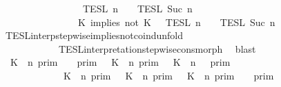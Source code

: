 \begin{isabellebody}
\ \ \ \ \ \ \ \ \ \ \ \ \ \ {\isasyminter}\ {\isacharparenleft}{\isasymlbrakk}{\isasymlbrakk}\ {\isasymPsi}\ {\isasymrbrakk}{\isasymrbrakk}\isactrlsub T\isactrlsub E\isactrlsub S\isactrlsub L\isactrlbsup {\isasymge}\ n\isactrlesup \ {\isasyminter}\ {\isasymlbrakk}{\isasymlbrakk}\ {\isasymPhi}\ {\isasymrbrakk}{\isasymrbrakk}\isactrlsub T\isactrlsub E\isactrlsub S\isactrlsub L\isactrlbsup {\isasymge}\ Suc\ n\isactrlesup {\isacharparenright}\isanewline
\ \ \ \ \ \ \ \ \ \ \ \ \ \ {\isacharequal}\ {\isasymlbrakk}{\isasymlbrakk}\ {\isacharparenleft}K\ implies\ not\ K\ {\isacharhash}\ {\isasymPsi}\ {\isasymrbrakk}{\isasymrbrakk}\isactrlsub T\isactrlsub E\isactrlsub S\isactrlsub L\isactrlbsup {\isasymge}\ n\isactrlesup \ {\isasyminter}\ {\isasymlbrakk}{\isasymlbrakk}\ {\isasymPhi}\ {\isasymrbrakk}{\isasymrbrakk}\isactrlsub T\isactrlsub E\isactrlsub S\isactrlsub L\isactrlbsup {\isasymge}\ Suc\ n\isactrlesup {\isacartoucheclose}\isanewline
\ \ \ \ \ \ \isamarkupfalse%
\ TESL{\isacharunderscore}interp{\isacharunderscore}stepwise{\isacharunderscore}implies{\isacharunderscore}not{\isacharunderscore}coind{\isacharunderscore}unfold\isanewline
\ \ \ \ \ \ \ \ \ \ \ \ TESL{\isacharunderscore}interpretation{\isacharunderscore}stepwise{\isacharunderscore}cons{\isacharunderscore}morph\ \isamarkupfalse%
\ blast\isanewline
\ \ \ \ \isamarkupfalse%
\ {\isacartoucheopen}{\isasymlbrakk}\ K\ {\isasymnot}{\isasymUp}\ n\ {\isasymrbrakk}\isactrlsub p\isactrlsub r\isactrlsub i\isactrlsub m\ {\isasyminter}\ {\isasymlbrakk}{\isasymlbrakk}\ {\isasymGamma}\ {\isasymrbrakk}{\isasymrbrakk}\isactrlsub p\isactrlsub r\isactrlsub i\isactrlsub m\ {\isasymunion}\ {\isasymlbrakk}\ K\ {\isasymUp}\ n\ {\isasymrbrakk}\isactrlsub p\isactrlsub r\isactrlsub i\isactrlsub m\ {\isasyminter}\ {\isasymlbrakk}{\isasymlbrakk}\ {\isacharparenleft}K\ {\isasymnot}{\isasymUp}\ n{\isacharparenright}\ {\isacharhash}\ {\isasymGamma}\ {\isasymrbrakk}{\isasymrbrakk}\isactrlsub p\isactrlsub r\isactrlsub i\isactrlsub m\isanewline
\ \ \ \ \ \ \ \ \ \ \ {\isacharequal}\ {\isacharparenleft}{\isasymlbrakk}\ K\ {\isasymnot}{\isasymUp}\ n\ {\isasymrbrakk}\isactrlsub p\isactrlsub r\isactrlsub i\isactrlsub m\ {\isasymunion}\ {\isasymlbrakk}\ K\ {\isasymUp}\ n\ {\isasymrbrakk}\isactrlsub p\isactrlsub r\isactrlsub i\isactrlsub m\ {\isasyminter}\ {\isasymlbrakk}\ K\ {\isasymnot}{\isasymUp}\ n\ {\isasymrbrakk}\isactrlsub p\isactrlsub r\isactrlsub i\isactrlsub m{\isacharparenright}\ {\isasyminter}\ {\isasymlbrakk}{\isasymlbrakk}\ {\isasymGamma}\ {\isasymrbrakk}{\isasymrbrakk}\isactrlsub p\isactrlsub r\isactrlsub i\isactrlsub m{\isacartoucheclose}\isanewline

\end{isabellebody}
